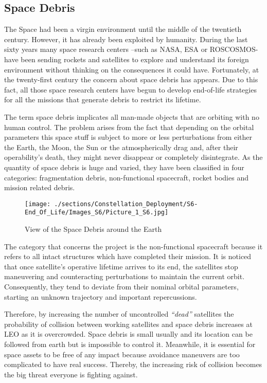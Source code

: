 \subsection{Space Debris}
The Space had been a virgin environment until the middle of the twentieth century. However, it has already been exploited by humanity. During the last sixty years many space research centers –such as NASA, ESA or ROSCOSMOS- have been sending rockets and satellites to explore and understand its foreign environment without thinking on the consequences it could have. Fortunately, at the twenty-first century the concern about space debris has appears. Due to this fact, all those space research centers have begun to develop end-of-life strategies for all the missions that generate debris to restrict its lifetime. 

The term space debris implicates all man-made objects that are orbiting with no human control. The problem arises from the fact that depending on the orbital parameters this space stuff is subject to more or less perturbations from either the Earth, the Moon, the Sun or the atmospherically drag and, after their operability’s death, they might never disappear or completely disintegrate. As the quantity of space debris is huge and varied, they have been classified in four categories: fragmentation debris, non-functional spacecraft, rocket bodies and mission related debris. 

\begin{figure}[H]
\centering 
\texttt{[image: ./sections/Constellation\_Deployment/S6-End\_Of\_Life/Images\_S6/Picture\_1\_S6.jpg]} 
\caption{View of the Space Debris around the Earth}
\end{figure}

The category that concerns the project is the non-functional spacecraft because it refers to all intact structures which have completed their mission. It is noticed that once satellite’s operative lifetime arrives to its end, the satellites stop maneuvering and counteracting perturbations to maintain the current orbit. Consequently, they tend to deviate from their nominal orbital parameters, starting an unknown trajectory and important repercussions. 

Therefore, by increasing the number of uncontrolled \textit{``dead''} satellites the probability of collision between working satellites and space debris increases at LEO as it is overcrowded. Space debris is small usually and its location can be followed from earth but is impossible to control it. Meanwhile, it is essential for space assets to be free of any impact because avoidance maneuvers are too complicated to have real success.  Thereby, the increasing risk of collision becomes the big threat everyone is fighting against. 

